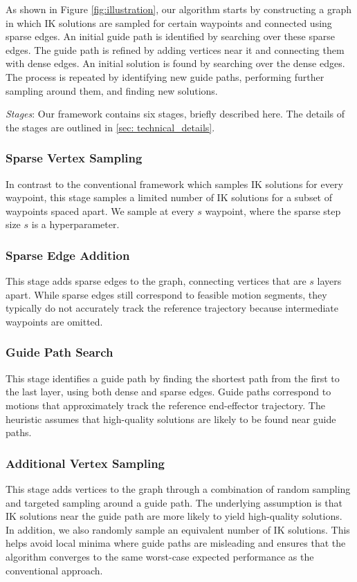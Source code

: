 As shown in Figure \ref{fig:illustration}, our algorithm starts by constructing a graph in which IK solutions are sampled for certain waypoints and connected using sparse edges. An initial guide path is identified by searching over these sparse edges. The guide path is refined by adding vertices near it and connecting them with dense edges. An initial solution is found by searching over the dense edges. The process is repeated by identifying new guide paths, performing further sampling around them, and finding new solutions. 

\textit{Stages}:
Our framework contains six stages, briefly described here. The details of the stages are outlined in \cref{sec: technical_details}.

\subsubsection{Sparse Vertex Sampling} In contrast to the conventional framework which samples IK solutions for every waypoint, this stage samples a limited number of IK solutions for a subset of waypoints spaced apart. We sample at every $s$ waypoint, where the sparse step size $s$ is a hyperparameter.

\subsubsection{Sparse Edge Addition} This stage adds sparse edges to the graph, connecting vertices that are $s$ layers apart. While sparse edges still correspond to feasible motion segments, they typically do not accurately track the reference trajectory because intermediate waypoints are omitted.

\subsubsection{Guide Path Search} 
This stage identifies a guide path by finding the shortest path from the first to the last layer, using both dense and sparse edges. Guide paths correspond to motions that approximately track the reference end-effector trajectory. The heuristic assumes that high-quality solutions are likely to be found near guide paths. 

\subsubsection{Additional Vertex Sampling}
This stage adds vertices to the graph through a combination of random sampling and targeted sampling around a guide path. The underlying assumption is that IK solutions near the guide path are more likely to yield high-quality solutions. In addition, we also randomly sample an equivalent number of IK solutions. 
This helps avoid local minima where guide paths are misleading and ensures that the algorithm converges to the same worst-case expected performance as the conventional approach. 


